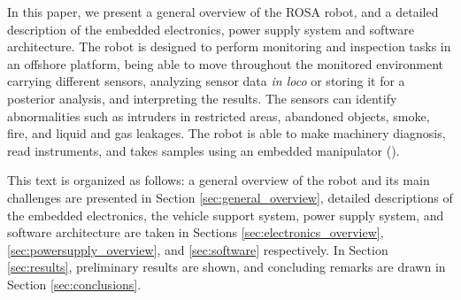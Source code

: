  

In this paper, we present a general overview of the ROSA robot, and a detailed
description of the embedded electronics, power supply system and software
architecture. The robot is designed to perform monitoring and inspection tasks
in an offshore platform, being able to move throughout the monitored
environment carrying different sensors, analyzing sensor data \emph{in loco} or
storing it for a posterior analysis, and interpreting the results. The sensors
can identify abnormalities such as intruders in restricted areas, abandoned
objects, smoke, fire, and liquid and gas leakages.
The robot is able to make machinery diagnosis, read instruments, and takes
samples using an embedded manipulator (\cite{cba}).

This text is organized as follows: a general overview of the robot and its main
challenges are presented in Section \ref{sec:general_overview}, detailed
descriptions of the embedded electronics, the vehicle support system, power
supply system, and software architecture are taken in
Sections \ref{sec:electronics_overview}, \ref{sec:powersupply_overview}, and
\ref{sec:software} respectively.
In Section \ref{sec:results}, preliminary results are shown, and concluding
remarks are drawn in Section \ref{sec:conclusions}.